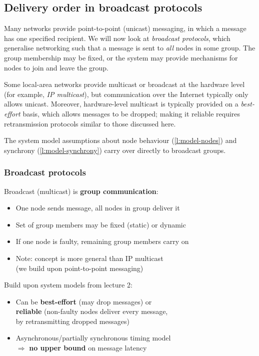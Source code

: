 \subsection{Delivery order in broadcast protocols}\label{sec:delivery-order}

Many networks provide point-to-point (unicast) messaging, in which a message has one specified recipient.
We will now look at \emph{broadcast protocols}, which generalise networking such that a message is sent to \emph{all} nodes in some group.
The group membership may be fixed, or the system may provide mechanisms for nodes to join and leave the group.

Some local-area networks provide multicast or broadcast at the hardware level (for example, \emph{IP multicast}), but communication over the Internet typically only allows unicast.
Moreover, hardware-level multicast is typically provided on a \emph{best-effort} basis, which allows messages to be dropped; making it reliable requires retransmission protocols similar to those discussed here.

The system model assumptions about node behaviour (\autoref{l:model-nodes}) and synchrony (\autoref{l:model-synchrony}) carry over directly to broadcast groups.

\begin{frame}
    \label{s:broadcast-intro}
    \frametitle{Broadcast protocols}
    Broadcast (multicast) is \textbf{group communication}:
    \begin{itemize}
        \item One node sends message, all nodes in group deliver it\pause
        \item Set of group members may be fixed (static) or dynamic\pause
        \item If one node is faulty, remaining group members carry on\pause
        \item Note: concept is more general than IP multicast\\
            (we build upon point-to-point messaging)\\[1em]\pause
    \end{itemize}
    Build upon system models from lecture 2:
    \begin{itemize}
        \item Can be \textbf{best-effort} (may drop messages) or \\
            \textbf{reliable} (non-faulty nodes deliver every message,\\
            by retransmitting dropped messages)\pause
        \item Asynchronous/partially synchronous timing model\\
            $\Longrightarrow$ \textbf{no upper bound} on message latency
    \end{itemize}
\end{frame}
\label{l:broadcast-intro}

